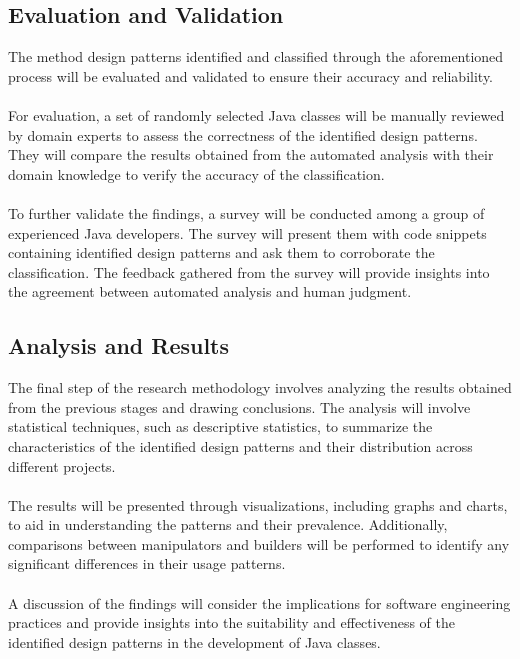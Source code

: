 \documentclass[draft]{article}
\begin{document}
\subsection{Evaluation and Validation}
The method design patterns identified and classified through the aforementioned process will be evaluated and validated to ensure their accuracy and reliability.\\
~\\
For evaluation, a set of randomly selected Java classes will be manually reviewed by domain experts to assess the correctness of the identified design patterns. They will compare the results obtained from the automated analysis with their domain knowledge to verify the accuracy of the classification.\\
~\\
To further validate the findings, a survey will be conducted among a group of experienced Java developers. The survey will present them with code snippets containing identified design patterns and ask them to corroborate the classification. The feedback gathered from the survey will provide insights into the agreement between automated analysis and human judgment.
\subsection{Analysis and Results}
The final step of the research methodology involves analyzing the results obtained from the previous stages and drawing conclusions. The analysis will involve statistical techniques, such as descriptive statistics, to summarize the characteristics of the identified design patterns and their distribution across different projects.\\
~\\
The results will be presented through visualizations, including graphs and charts, to aid in understanding the patterns and their prevalence. Additionally, comparisons between manipulators and builders will be performed to identify any significant differences in their usage patterns.\\
~\\
A discussion of the findings will consider the implications for software engineering practices and provide insights into the suitability and effectiveness of the identified design patterns in the development of Java classes.
\end{document}
